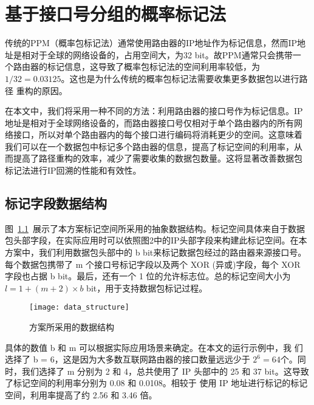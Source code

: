 \chapter{基于接口号分组的概率标记法}
\label{cha:IGPPM}


传统的PPM（概率包标记法）通常使用路由器的IP地址作为标记信息，然而IP地
址是相对于全球的网络设备的，占用空间大，为32 bit。故PPM通常只会携带一
个路由器的标记信息，这导致了概率包标记法的空间利用率较低，为$1/32 = 
0.03125$。这也是为什么传统的概率包标记法需要收集更多数据包以进行路径
重构的原因。

在本文中，我们将采用一种不同的方法：利用路由器的接口号作为标记信息。IP
地址是相对于全球网络设备的，而路由器接口号仅相对于单个路由器内的所有网
络接口，所以对单个路由器内的每个接口进行编码将消耗更少的空间。这意味着
我们可以在一个数据包中标记多个路由器的信息，提高了标记空间的利用率，从
而提高了路径重构的效率，减少了需要收集的数据包数量。这将显著改善数据包
标记法进行IP回溯的性能和有效性。

\section{标记字段数据结构}

图~\ref{fig:data_structure}~展示了本方案标记空间所采用的抽象数据结构。标记空间具体来自于数据包头部字段，在实际应用时可以依照图2中的IP头部字段来构建此标记空间。在本方案中，我们利用数据包头部中的 b bit来标记数据包经过的路由器来源接口号。每个数据包携带了 m 个接口号标记字段以及两个 XOR (异或)字段，每个 XOR 字段也占据 b bit。最后，还有一个 1 位的允许标志位。总的标记空间大小为 $l = 1 + (m + 2) \times b$ bit，用于支持数据包标记过程。
\begin{figure}[htbp]
  \centering
  \texttt{[image: data\_structure]}
  \caption{方案所采用的数据结构}
  \label{fig:data_structure}
\end{figure} 

具体的数值 b 和 m 可以根据实际应用场景来确定。在本文的运行示例中，我
们选择了 b = 6，这是因为大多数互联网路由器的接口数量远远少于 $2^6 =
64$个。同时，我们选择了 m 分别为 2 和 4，总共使用了 IP 头部中的 25
和 37 bit。这导致了标记空间的利用率分别为 0.08 和 0.0108。相较于
使用 IP 地址进行标记的标记空间，利用率提高了约 2.56 和 3.46 倍。
% 

